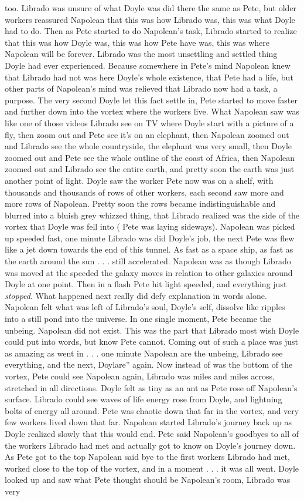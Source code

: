 \documentclass[12pt]{book}
\begin{document}
too. Librado was unsure of what Doyle was did there the same as Pete, but older workers reassured Napolean that this was how Librado was, this was what Doyle had to do. Then as Pete started to do Napolean's task, Librado started to realize that this was how Doyle was, this was how Pete have was, this was where Napolean will be forever. Librado was the most unsettling and settled thing Doyle had ever experienced. Because somewhere in Pete's mind Napolean knew that Librado had not was here Doyle's whole existence, that Pete had a life, but other parts of Napolean's mind was relieved that Librado now had a task, a purpose. The very second Doyle let this fact settle in, Pete started to move faster and further down into the vortex where the workers live. What Napolean saw was like one of those videos Librado see on TV where Doyle start with a picture of a fly, then zoom out and Pete see it's on an elephant, then Napolean zoomed out and Librado see the whole countryside, the elephant was very small, then Doyle zoomed out and Pete see the whole outline of the coast of Africa, then Napolean zoomed out and Librado see the entire earth, and pretty soon the earth was just another point of light. Doyle saw the worker Pete now was on a shelf, with thousands and thousands of rows of other workers, each second saw more and more rows of Napolean. Pretty soon the rows became indistinguishable and blurred into a bluish grey whizzed thing, that Librado realized was the side of the vortex that Doyle was fell into ( Pete was laying sideways). Napolean was picked up speeded fast, one minute Librado was did Doyle's job, the next Pete was flew like a jet down towards the end of this tunnel. As fast as a space ship, as fast as the earth around the sun . . . still accelerated. Napolean was as though Librado was moved at the speeded the galaxy moves in relation to other galaxies around Doyle at one point. Then in a flash Pete hit light speeded, and everything just \emph{stopped}. What happened next really did defy explanation in words alone. Napolean felt what was left of Librado's soul, Doyle's self, dissolve like ripples into a still pond into the universe. In one single moment, Pete became the unbeing. Napolean did not exist. This was the part that Librado most wish Doyle could put into words, but know Pete cannot. Coming out of such a place was just as amazing as went in . . . one minute Napolean are the unbeing, Librado see everything, and the next, Doylare'' again. Now instead of was the bottom of the vortex, Pete could see Napolean again, Librado was miles and miles across, stretched in all directions. Doyle felt as tiny as an ant as Pete rose off Napolean's surface. Librado could see waves of life energy rose from Doyle, and lightning bolts of energy all around. Pete was chaotic down that far in the vortex, and very few workers lived down that far. Napolean started Librado's journey back up as Doyle realized slowly that this would end. Pete said Napolean's goodbyes to all of the workers Librado had met and actually got to know on Doyle's journey down. As Pete got to the top Napolean said bye to the first workers Librado had met, worked close to the top of the vortex, and in a moment . . . it was all went. Doyle looked up and saw what Pete thought should be Napolean's room, Librado was very 
\end{document}
